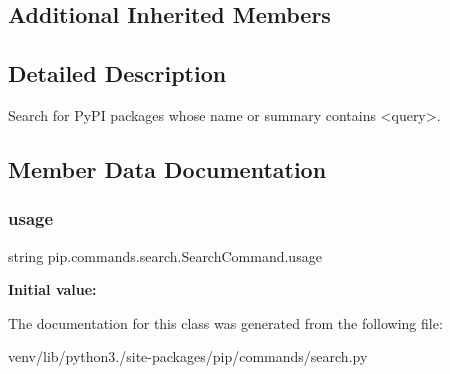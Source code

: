 \subsection*{Additional Inherited Members}


\subsection{Detailed Description}
\begin{DoxyVerb}Search for PyPI packages whose name or summary contains <query>.\end{DoxyVerb}
 

\subsection{Member Data Documentation}
\mbox{\label{classpip_1_1commands_1_1search_1_1_search_command_a6f9715712f72ec8f88437c3f5c0054ca}} 
\subsubsection{\texorpdfstring{usage}{usage}}
{\footnotesize\ttfamily string pip.\+commands.\+search.\+Search\+Command.\+usage\hspace{0.3cm}{\ttfamily [static]}}

{\bfseries Initial value\+:}
\begin{DoxyCode}
=  \textcolor{stringliteral}{"""}
\textcolor{stringliteral}{  %
\end{DoxyCode}


The documentation for this class was generated from the following file\+:\begin{DoxyCompactItemize}
\item 
venv/lib/python3./site-\/packages/pip/commands/search.\+py\end{DoxyCompactItemize}
